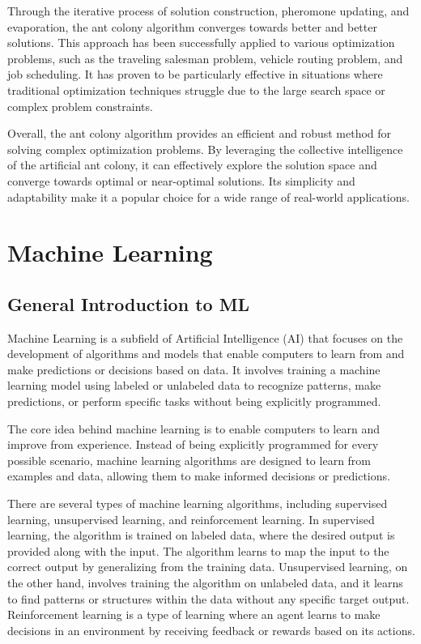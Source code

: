 Through the iterative process of solution construction, pheromone updating, and evaporation, the ant colony algorithm converges towards better and better solutions. This approach has been successfully applied to various optimization problems, such as the traveling salesman problem, vehicle routing problem, and job scheduling. It has proven to be particularly effective in situations where traditional optimization techniques struggle due to the large search space or complex problem constraints.

Overall, the ant colony algorithm provides an efficient and robust method for solving complex optimization problems. By leveraging the collective intelligence of the artificial ant colony, it can effectively explore the solution space and converge towards optimal or near-optimal solutions. Its simplicity and adaptability make it a popular choice for a wide range of real-world applications.

\section{Machine Learning}%
\subsection{General Introduction to ML}
Machine Learning is a subfield of Artificial Intelligence (AI) that focuses on the development of algorithms and models that enable computers to learn from and make predictions or decisions based on data. It involves training a machine learning model using labeled or unlabeled data to recognize patterns, make predictions, or perform specific tasks without being explicitly programmed.

The core idea behind machine learning is to enable computers to learn and improve from experience. Instead of being explicitly programmed for every possible scenario, machine learning algorithms are designed to learn from examples and data, allowing them to make informed decisions or predictions.

There are several types of machine learning algorithms, including supervised learning, unsupervised learning, and reinforcement learning. In supervised learning, the algorithm is trained on labeled data, where the desired output is provided along with the input. The algorithm learns to map the input to the correct output by generalizing from the training data. Unsupervised learning, on the other hand, involves training the algorithm on unlabeled data, and it learns to find patterns or structures within the data without any specific target output. Reinforcement learning is a type of learning where an agent learns to make decisions in an environment by receiving feedback or rewards based on its actions.

